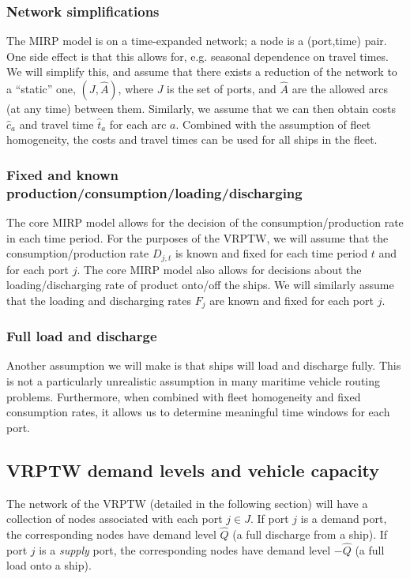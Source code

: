 \documentclass[11pt]{article}
\theoremstyle{definition}
\newcommand{\0}{\mathbf{0}}
\renewcommand{\hat}{\widehat}
\begin{document}
\subsubsection*{Network simplifications}
The MIRP model is on a time-expanded network;
a node is a (port,time) pair.
One side effect is that this allows for, e.g. seasonal dependence on travel times.
We will simplify this, and assume that there exists a reduction of the network to a ``static'' one, $(J,\hat{A})$, where $J$ is the set of ports, and $\hat{A}$ are the allowed arcs (at any time) between them.
Similarly, we assume that we can then obtain costs $\hat{c}_a$ and travel time $\hat{t}_a$ for each arc $a$.
Combined with the assumption of fleet homogeneity, the costs and travel times can be used for all ships in the fleet.


\subsubsection*{Fixed and known production/consumption/loading/discharging}
The core MIRP model allows for the decision of the consumption/production rate in each time period.
For the purposes of the VRPTW, we will assume that the consumption/production rate $D_{j,t}$ is known and fixed for each time period $t$ and for each port $j$.
The core MIRP model also allows for decisions about the loading/discharging rate of product onto/off the ships.
We will similarly assume that the loading and discharging rates $F_j$ are known and fixed for each port $j$.

\subsubsection*{Full load and discharge}
Another assumption we will make is that ships will load and discharge fully.
This is not a particularly unrealistic assumption in many maritime vehicle routing problems.
Furthermore, when combined with fleet homogeneity and fixed consumption rates, it allows us to determine meaningful time windows for each port.

\subsection{VRPTW demand levels and vehicle capacity}

The network of the VRPTW (detailed in the following section) will have a collection of nodes associated with each port $j \in J$.
If port $j$ is a demand port, the corresponding nodes have demand level $\hat{Q}$ (a full discharge from a ship).
If port $j$ is a \emph{supply} port, the corresponding nodes have demand level $-\hat{Q}$ (a full load onto a ship).
\end{document}
